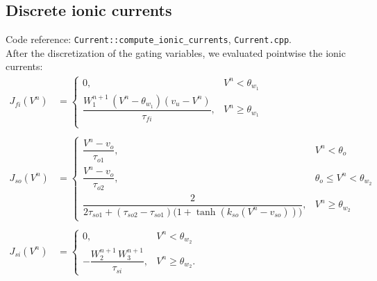 \documentclass{Configuration_Files/PoliMi3i_thesis}
\newcommand{\tanhop}{\tanh}
\begin{document}
\subsection{Discrete ionic currents}
Code reference: \texttt{Current::compute\_ionic\_currents}, \texttt{Current.cpp}.\\
After the discretization of the gating variables, we evaluated pointwise the ionic currents:\\
\begin{align*}
J_{fi}(V^n) &= \begin{cases}
0, & V^n<\theta_{w_1}\\
\dfrac{W^{n+1}_1\,(V^n-\theta_{w_1})(v_u-V^n)}{\tau_{fi}}, & V^n\ge\theta_{w_1}\\
\end{cases} \\
\\
J_{so}(V^n) &= \begin{cases}
\dfrac{V^n-v_o}{\tau_{o1}}, & V^n<\theta_o\\[1em]
\dfrac{V^n-v_o}{\tau_{o2}}, & \theta_o\le V^n<\theta_{w_2}\\
\dfrac{2}{2\tau_{so1}+(\tau_{so2}-\tau_{so1})\big(1+\tanhop(k_{so}(V^n-v_{so}))\big)}, & V^n\ge\theta_{w_2}
\end{cases} \\
\\
J_{si}(V^n) &= \begin{cases}
0, & V^n<\theta_{w_2}\\
-\dfrac{W^{n+1}_2\,W^{n+1}_3}{\tau_{si}}, & V^n\ge\theta_{w_2}.
\end{cases}
\end{align*}
\end{document}
